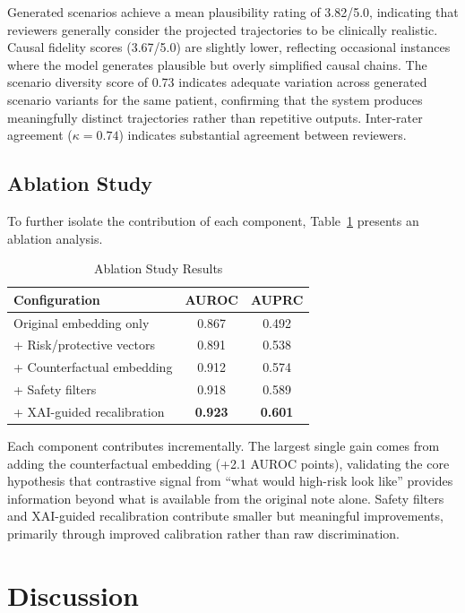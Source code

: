 \documentclass[conference]{IEEEtran}
\begin{document}
Generated scenarios achieve a mean plausibility rating of 3.82/5.0, indicating that reviewers generally consider the projected trajectories to be clinically realistic. Causal fidelity scores (3.67/5.0) are slightly lower, reflecting occasional instances where the model generates plausible but overly simplified causal chains. The scenario diversity score of 0.73 indicates adequate variation across generated scenario variants for the same patient, confirming that the system produces meaningfully distinct trajectories rather than repetitive outputs. Inter-rater agreement ($\kappa = 0.74$) indicates substantial agreement between reviewers.

\subsection{Ablation Study}

To further isolate the contribution of each component, Table~\ref{tab:ablation} presents an ablation analysis.

\begin{table}[t]
\caption{Ablation Study Results}
\label{tab:ablation}
\centering
\begin{tabular}{lcc}
\hline
\textbf{Configuration} & \textbf{AUROC} & \textbf{AUPRC} \\
\hline
Original embedding only & 0.867 & 0.492 \\
+ Risk/protective vectors & 0.891 & 0.538 \\
+ Counterfactual embedding & 0.912 & 0.574 \\
+ Safety filters & 0.918 & 0.589 \\
+ XAI-guided recalibration & \textbf{0.923} & \textbf{0.601} \\
\hline
\end{tabular}
\end{table}

Each component contributes incrementally. The largest single gain comes from adding the counterfactual embedding (+2.1 AUROC points), validating the core hypothesis that contrastive signal from ``what would high-risk look like'' provides information beyond what is available from the original note alone. Safety filters and XAI-guided recalibration contribute smaller but meaningful improvements, primarily through improved calibration rather than raw discrimination.

\section{Discussion}
\end{document}
